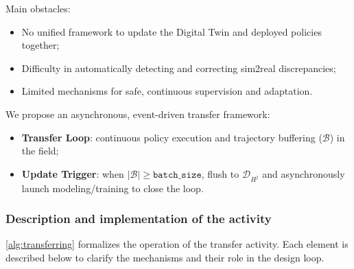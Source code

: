 \documentclass[pdflatex,sn-mathphys-num]{sn-jnl}%
\theoremstyle{thmstyleone}%
\theoremstyle{thmstyletwo}%
\theoremstyle{thmstylethree}%
\begin{document}
Main obstacles:
\begin{itemize}
    \item No unified framework to update the Digital Twin and deployed policies together;
    \item Difficulty in automatically detecting and correcting sim2real discrepancies;
    \item Limited mechanisms for safe, continuous supervision and adaptation.
\end{itemize}

We propose an asynchronous, event-driven transfer framework:
\begin{itemize}
    \item \textbf{Transfer Loop}: continuous policy execution and trajectory buffering ($\mathcal{B}$) in the field;
    \item \textbf{Update Trigger}: when $\lvert\mathcal{B}\rvert \ge \texttt{batch\_size}$, flush to $\mathcal{D}_{H^j}$ and asynchronously launch modeling/training to close the loop.
\end{itemize}

\subsubsection*{Description and implementation of the activity}

\autoref{alg:transferring} formalizes the operation of the transfer activity.
Each element is described below to clarify the mechanisms and their role in the design loop.
\end{document}
